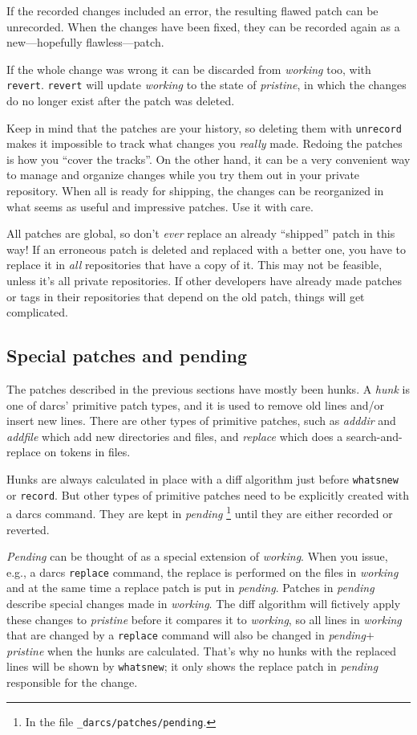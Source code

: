 	If the recorded changes included an error,
	the resulting flawed patch can be unrecorded.
	When the changes have been fixed,
	they can be recorded again as a new---hopefully flawless---patch.

	If the whole change was wrong it can be discarded from \emph{working} too,
	with \verb!revert!.
	\verb!revert! will update \emph{working} to the state of \emph{pristine},
	in which the changes do no longer exist after the patch was deleted.

	Keep in mind that the patches are your history,
	so deleting them with \verb!unrecord! makes it impossible to track
	what changes you \emph{really} made.
	Redoing the patches is how you ``cover the tracks''.
	On the other hand,
	it can be a very convenient way to manage and organize changes
	while you try them out in your private repository.
	When all is ready for shipping,
	the changes can be reorganized in what seems as useful and impressive patches.
	Use it with care.

	All patches are global,
	so don't \emph{ever} replace an already ``shipped'' patch in this way!
	If an erroneous patch is deleted and replaced with a better one,
	you have to replace it in \emph{all} repositories that have a copy of it.
	This may not be feasible, unless it's all private repositories.
	If other developers have already made patches or tags in their repositories
	that depend on the old patch, things will get complicated.


\subsection{Special patches and pending}

The patches described in the previous sections have mostly been hunks.
A \emph{hunk} is one of darcs' primitive patch types,
and it is used to remove old lines and/or insert new lines.
There are other types of primitive patches,
such as \emph{adddir} and \emph{addfile}
which add new directories and files,
and \emph{replace}
which does a search-and-replace on tokens in files.

Hunks are always calculated in place with a diff algorithm
just before \verb!whatsnew! or \verb!record!.
But other types of primitive patches need to be explicitly created
with a darcs command.
They are kept in \emph{pending}%
\footnote{In the file {\tt\_darcs/patches/pending}.}
until they are either recorded or reverted.

\emph{Pending} can be thought of as a special extension of \emph{working}.
When you issue, e.g., a darcs \verb!replace! command,
the replace is performed on the files in \emph{working}
and at the same time a replace patch is put in \emph{pending}.
Patches in \emph{pending} describe special changes made in \emph{working}.
The diff algorithm will fictively apply these changes to \emph{pristine}
before it compares it to \emph{working},
so all lines in \emph{working} that are changed by a \verb!replace! command
will also be changed in \emph{pending}$+$\emph{pristine}
when the hunks are calculated.
That's why no hunks with the replaced lines will be shown by \verb!whatsnew!;
it only shows the replace patch in \emph{pending} responsible for the change.

